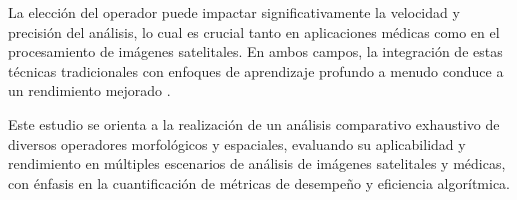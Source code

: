 La elección del operador puede impactar significativamente la velocidad y precisión del análisis, lo cual es crucial tanto en aplicaciones médicas como en el procesamiento de imágenes satelitales. En ambos campos, la integración de estas técnicas tradicionales con enfoques de aprendizaje profundo a menudo conduce a un rendimiento mejorado \autocite{asokanMachineLearningBased2019}.

Este estudio se orienta a la realización de un análisis comparativo exhaustivo de diversos operadores morfológicos y espaciales, evaluando su aplicabilidad y rendimiento en múltiples escenarios de análisis de imágenes satelitales y médicas, con énfasis en la cuantificación de métricas de desempeño y eficiencia algorítmica.
